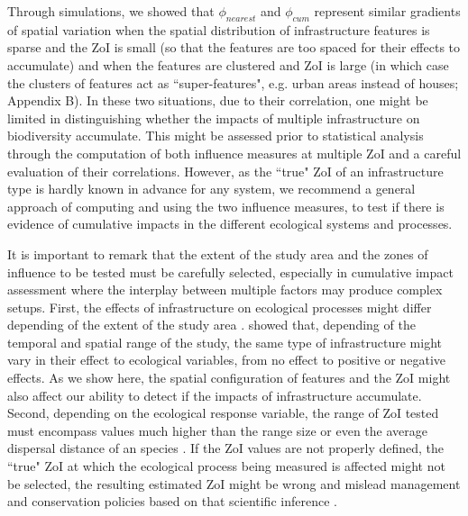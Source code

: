 \documentclass[titlepage]{article}
\begin{document}
Through simulations, we showed that $\phi_{nearest}$ and $\phi_{cum}$ represent similar gradients of spatial variation when the spatial distribution of infrastructure features is sparse and the ZoI is small (so that the features are too spaced for their effects to accumulate) and when the features are clustered and ZoI is large (in which case the clusters of features act as ``super-features", e.g. urban areas instead of houses; Appendix B). In these two situations, due to their correlation, one might be limited in distinguishing whether the impacts of multiple infrastructure on biodiversity accumulate. This might be assessed prior to statistical analysis through the computation of both influence measures at multiple ZoI and a careful evaluation of their correlations. However, as the ``true" ZoI of an infrastructure type is hardly known in advance for any system, we recommend a general approach of computing and using the two influence measures, to test if there is evidence of cumulative impacts in the different ecological systems and processes.

It is important to remark that the extent of the study area and the zones of influence to be tested must be carefully selected, especially in cumulative impact assessment where the interplay between multiple factors may produce complex setups. First, the effects of infrastructure on ecological processes might differ depending of the extent of the study area \citep{vistnes_matter_2008}. \citet{skarin_human_2014} showed that, depending of the temporal and spatial range of the study, the same type of infrastructure might vary in their effect to ecological variables, from no effect to positive or negative effects. As we show here, the spatial configuration of features and the ZoI might also affect our ability to detect if the impacts of infrastructure accumulate. 
Second, depending on the ecological response variable, the range of ZoI tested must encompass values much higher than the range size or even the average dispersal distance of an species \citep{jackson_what_2012}. If the ZoI values are not properly defined, the ``true" ZoI at which the ecological process being measured is affected might not be selected, the resulting estimated ZoI might be wrong and mislead management and conservation policies based on that scientific inference \citep[e.g.][]{jackson_are_2015}.
\end{document}
